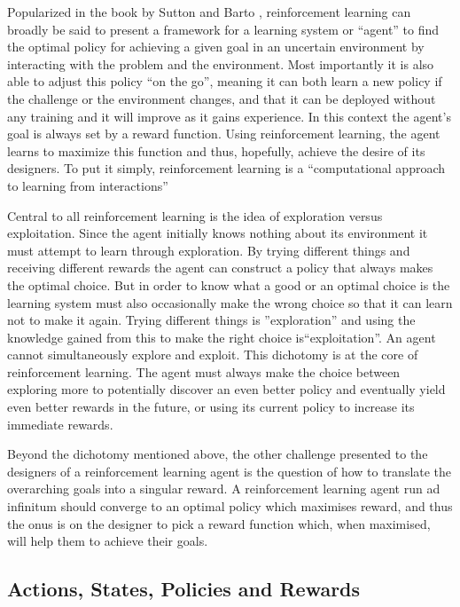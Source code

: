 Popularized in the book by Sutton and Barto \cite{sutton_barto}, reinforcement learning can broadly be said to present a framework for a learning system or “agent” to find the optimal policy for achieving a given goal in an uncertain environment by interacting with the problem and the environment. Most importantly it is also able to adjust this policy ``on the go'', meaning it can both learn a new policy if the challenge or the environment changes, and that it can be deployed without any training and it will improve as it gains experience. In this context the agent's goal is always set by a reward function. Using reinforcement learning, the agent learns to maximize this function and thus, hopefully, achieve the desire of its designers. To put it simply, reinforcement learning is a “computational approach to learning from interactions” \cite{sutton_barto}

Central to all reinforcement learning is the idea of exploration versus exploitation. Since the agent initially knows nothing about its environment it must attempt  to learn through exploration. By trying different things and receiving different rewards the agent can construct a policy that always makes the optimal choice. But in order to know what a good or an optimal choice is the learning system must also occasionally make the wrong choice so that it can learn not to make it again. Trying different things is ''exploration'' and using the knowledge gained from this to make the right choice is``exploitation''. An agent cannot simultaneously explore and exploit. This dichotomy is at the core of reinforcement learning. The agent must always make the choice between exploring more to potentially discover an even better policy and eventually yield even better rewards in the future, or using its current policy to increase its immediate rewards.

Beyond the dichotomy mentioned above, the other challenge presented to the designers of a reinforcement learning agent is the question of how to translate the overarching goals into a singular reward. A reinforcement learning agent run ad infinitum should converge to an optimal policy which maximises reward, and thus the onus is on the designer to pick a reward function which, when maximised, will help them to achieve their goals. 

\subsection{Actions, States, Policies and Rewards}
\label{subsec:agent}

